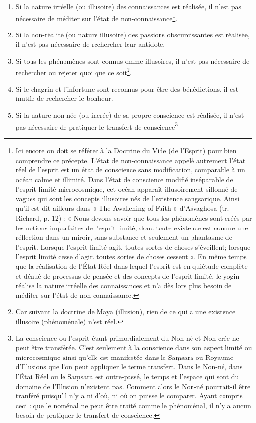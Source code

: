 \documentclass[10pt]{book}
\begin{document}
\begin{enumerate}[1.-]
\item Si la nature irréelle (ou illusoire) des connaissances est réalisée, il n'est pas nécessaire de méditer sur l'état de non-connaissance\footnote{Ici encore on doit se référer à la Doctrine du Vide (de l'Esprit) pour bien comprendre ce précepte. L'état de non-connaissance appelé autrement l'état réel de l'esprit est un état de conscience sans modification, comparable à un océan calme et illimité. Dans l'état de conscience modifié inséparable de l'esprit limité microcosmique, cet océan apparaît illusoirement sillonné de vagues qui sont les concepts illusoires nés de l'existence sangsarique. 
Ainsi qu'il est dit ailleurs dans « The Awakening of Faith » d'Aśvaghosa (tr. Richard, p. 12) : « Nous devons savoir que tous les phénomènes sont créés par les notions imparfaites de l'esprit limité, donc toute existence est comme une réflection dans un miroir, sans substance et seulement un phantasme de l'esprit. Lorsque l'esprit limité agit, toutes sortes de choses s'éveillent; lorsque l'esprit limité cesse d'agir, toutes sortes de choses cessent ». En même temps que la réalisation de l'État Réel dans lequel l'esprit est en quiétude complète et dénué de processus de pensée et des concepts de l'esprit limité, le yogin réalise la nature irréelle des connaissances et n'a dès lors plus besoin de méditer sur l'état de non-connaissance.}.
\item Si la non-réalité (ou nature illusoire) des passions obscurcissantes est réalisée, il n'est pas nécessaire de rechercher leur antidote.
\item Si tous les phénomènes sont connus omme illusoires, il n'est pas nécessaire de rechercher ou rejeter quoi que ce soit\footnote{Car suivant la doctrine de Māyā (illusion), rien de ce qui a une existence illusoire (phénoménale) n'est réel.}.
\item Si le chagrin et l'infortune sont reconnus pour être des bénédictions, il est inutile de rechercher le bonheur.
\item Si la nature non-née (ou incrée) de sa propre conscience est réalisée, il n'est pas nécessaire de pratiquer le transfert de conscience\footnote{La conscience ou l'esprit étant primordialement du Non-né et Non-crée ne peut être transférée. C'est seulement à la conscience dans son aspect limité ou microcosmique ainsi qu'elle est manifestée dans le Saṃsāra ou Royaume d'Illusions que l'on peut appliquer le terme transfert. Dans le Non-né, dans l'État Réel ou le Saṃsāra est outre-passé, le temps et l'espace qui sont du domaine de l'Illusion n'existent pas. Comment alors le Non-né pourrait-il être tranféré puisqu'il n'y a ni d'où, ni où on puisse le comparer. Ayant compris ceci : que le noménal ne peut être traité comme le phénoménal, il n'y a aucun besoin de pratiquer le transfert de conscience.}%

\end{enumerate}
\end{document}
